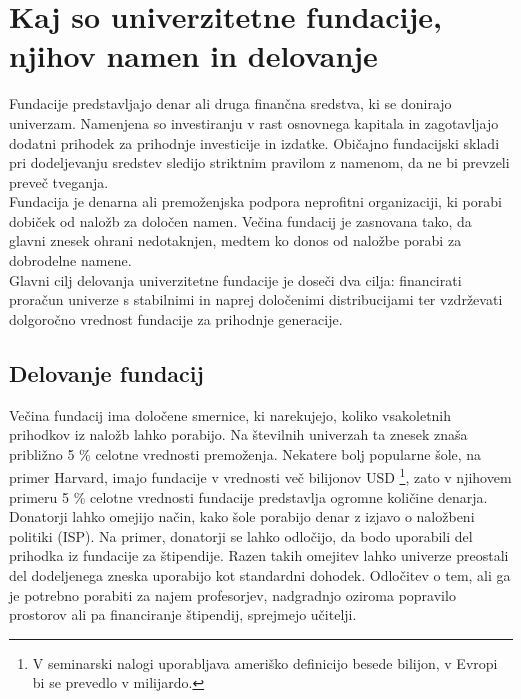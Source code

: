 \documentclass[12pt, a4paper]{article}
\begin{document}
\section{Kaj so univerzitetne fundacije, njihov namen in delovanje}


Fundacije predstavljajo denar ali druga finančna sredstva, ki se donirajo univerzam. Namenjena so investiranju v rast osnovnega kapitala in zagotavljajo dodatni prihodek za prihodnje investicije in izdatke. Običajno fundacijski skladi pri dodeljevanju sredstev sledijo striktnim pravilom z namenom, da ne bi prevzeli preveč tveganja. \\

Fundacija je denarna ali premoženjska podpora neprofitni organizaciji, ki porabi dobiček od naložb za določen namen. Večina fundacij je zasnovana tako, da glavni znesek ohrani nedotaknjen, medtem ko donos od naložbe porabi za dobrodelne namene. \\

Glavni cilj delovanja univerzitetne fundacije je doseči dva cilja: financirati proračun univerze s stabilnimi in naprej določenimi distribucijami ter vzdrževati dolgoročno vrednost fundacije za prihodnje generacije. \cite{harvard-porocilo}

\subsection{Delovanje fundacij}

Večina fundacij ima določene smernice, ki narekujejo, koliko vsakoletnih prihodkov iz naložb lahko porabijo. Na številnih univerzah ta znesek znaša približno 5 \% celotne vrednosti premoženja. Nekatere bolj popularne šole, na primer Harvard, imajo fundacije v vrednosti več bilijonov USD \footnote{V seminarski nalogi uporabljava ameriško definicijo besede bilijon, v Evropi bi se prevedlo v milijardo.}, zato v njihovem primeru 5 \% celotne vrednosti fundacije predstavlja ogromne količine denarja. \cite{Investopedia}\\

Donatorji lahko omejijo način, kako šole porabijo denar z izjavo o naložbeni politiki (ISP). Na primer, donatorji se lahko odločijo, da bodo uporabili del prihodka iz fundacije za štipendije. Razen takih omejitev lahko univerze preostali del dodeljenega zneska uporabijo kot standardni dohodek. Odločitev o tem, ali ga je potrebno porabiti za najem profesorjev, nadgradnjo oziroma popravilo prostorov ali pa financiranje štipendij, sprejmejo učitelji. \\
\end{document}
